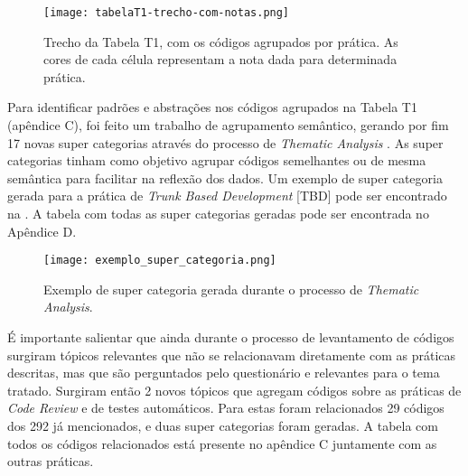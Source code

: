 \begin{figure}[ht]
    \begin{center}
    \texttt{[image: tabelaT1-trecho-com-notas.png]}
    \end{center}
    \caption[Trecho da Tabela T1]{
        Trecho da Tabela T1, com os códigos agrupados por prática. As cores de cada célula representam a nota dada para determinada prática.
}\label{trecho_tabela_t1}
\end{figure}

Para identificar padrões e abstrações nos códigos agrupados na Tabela T1 (apêndice C), foi feito um trabalho de agrupamento semântico, gerando por fim 17 novas super categorias através do processo de \emph{Thematic Analysis} \cite{groundedTheory}. As super categorias tinham como objetivo agrupar códigos semelhantes ou de mesma semântica para facilitar na reflexão dos dados. Um exemplo de super categoria gerada para a prática de \emph{Trunk Based Development} [TBD] pode ser encontrado na . A tabela com todas as super categorias geradas pode ser encontrada no Apêndice D.

\begin{figure}[ht]
\begin{center}
\texttt{[image: exemplo\_super\_categoria.png]}
\end{center}
\caption[Exemplo de super categoria]{
    Exemplo de super categoria gerada durante o processo de \emph{Thematic Analysis}.
}\label{exemplo_super_categoria}
\end{figure}

É importante salientar que ainda durante o processo de levantamento de códigos surgiram tópicos relevantes que não se relacionavam diretamente com as práticas descritas, mas que são perguntados pelo questionário e relevantes para o tema tratado. Surgiram então 2 novos tópicos que agregam códigos sobre as práticas de \emph{Code Review} e de testes automáticos. Para estas foram relacionados 29 códigos dos 292 já mencionados, e duas super categorias foram geradas. A tabela com todos os códigos relacionados está presente no apêndice C juntamente com as outras práticas.
